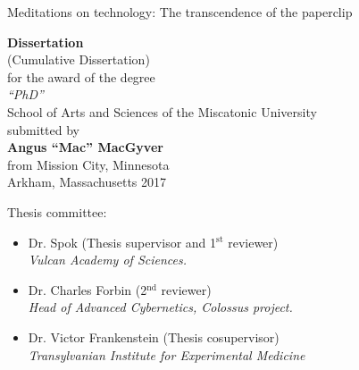 %
%
%
%
%
%
%
%
\thispagestyle{empty}

\vspace*{-0.1cm}
\begin{center}
   {\Huge \textsf{Meditations on technology:\vspace{.3cm} The transcendence of the paperclip}\\}
   
    \vspace{3cm}
   {\Large \textbf{Dissertation}\\(Cumulative Dissertation)\\}
   \vspace{3cm}
   {\large for the award of the degree\\
   \textit{``PhD''}\\
    \vspace{.5cm} School of Arts and Sciences of the Miscatonic University\\
   submitted by}\\
   \vspace{3cm}
   {\Large \textbf{Angus ``Mac'' MacGyver}}\\
   \vspace{.2cm}
   {\large from Mission City, Minnesota\\
   \vspace{5cm}
   Arkham, Massachusetts 2017}
\end{center}
%
%
%
%
%
%
%
%
%
%
%
%
%
%
\newpage
\thispagestyle{empty}
\par\vspace*{\fill}

\hspace{-1cm}Thesis committee:
\begin{itemize}
 \item Dr. Spok (Thesis supervisor and 1$^\text{st}$ reviewer) \\
 \textit{Vulcan Academy of Sciences.}
 \item Dr. Charles Forbin (2$^\text{nd}$ reviewer)\\
 \textit{Head of Advanced Cybernetics, Colossus project.}
 \item Dr. Victor Frankenstein (Thesis cosupervisor)\\
 \textit{Transylvanian Institute for Experimental Medicine}
\end{itemize}

